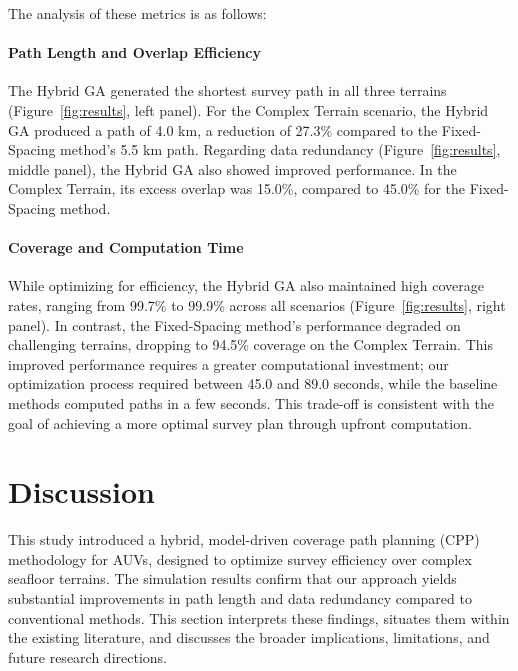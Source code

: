 \documentclass[compress]{cm}
\begin{document}
The analysis of these metrics is as follows:
\paragraph{Path Length and Overlap Efficiency} The Hybrid GA generated the shortest survey path in all three terrains (Figure~\ref{fig:results}, left panel). For the Complex Terrain scenario, the Hybrid GA produced a path of 4.0 km, a reduction of 27.3\% compared to the Fixed-Spacing method's 5.5 km path. Regarding data redundancy (Figure~\ref{fig:results}, middle panel), the Hybrid GA also showed improved performance. In the Complex Terrain, its excess overlap was 15.0\%, compared to 45.0\% for the Fixed-Spacing method.

\paragraph{Coverage and Computation Time} While optimizing for efficiency, the Hybrid GA also maintained high coverage rates, ranging from 99.7\% to 99.9\% across all scenarios (Figure~\ref{fig:results}, right panel). In contrast, the Fixed-Spacing method's performance degraded on challenging terrains, dropping to 94.5\% coverage on the Complex Terrain. This improved performance requires a greater computational investment; our optimization process required between 45.0 and 89.0 seconds, while the baseline methods computed paths in a few seconds. This trade-off is consistent with the goal of achieving a more optimal survey plan through upfront computation.

\section{Discussion}
This study introduced a hybrid, model-driven coverage path planning (CPP) methodology for AUVs, designed to optimize survey efficiency over complex seafloor terrains. The simulation results confirm that our approach yields substantial improvements in path length and data redundancy compared to conventional methods. This section interprets these findings, situates them within the existing literature, and discusses the broader implications, limitations, and future research directions.
\end{document}
